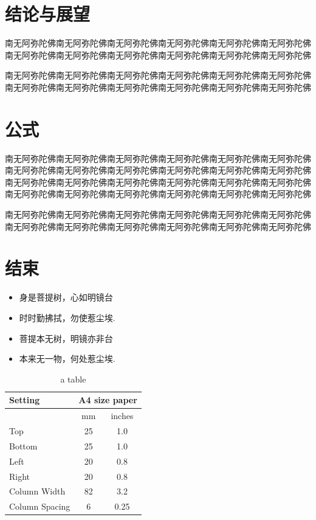 \documentclass[UTF8,a4paper,10pt]{article}
\begin{document}
\section{结论与展望}
南无阿弥陀佛南无阿弥陀佛南无阿弥陀佛南无阿弥陀佛南无阿弥陀佛南无阿弥陀佛南无阿弥陀佛南无阿弥陀佛南无阿弥陀佛南无阿弥陀佛南无阿弥陀佛南无阿弥陀佛
\par

\noindent 南无阿弥陀佛南无阿弥陀佛南无阿弥陀佛南无阿弥陀佛南无阿弥陀佛南无阿弥陀佛南无阿弥陀佛南无阿弥陀佛南无阿弥陀佛南无阿弥陀佛南无阿弥陀佛南无阿弥陀佛
\section{公式}
南无阿弥陀佛南无阿弥陀佛南无阿弥陀佛南无阿弥陀佛南无阿弥陀佛南无阿弥陀佛南无阿弥陀佛南无阿弥陀佛南无阿弥陀佛南无阿弥陀佛南无阿弥陀佛南无阿弥陀佛南无阿弥陀佛南无阿弥陀佛南无阿弥陀佛南无阿弥陀佛南无阿弥陀佛南无阿弥陀佛南无阿弥陀佛南无阿弥陀佛南无阿弥陀佛南无阿弥陀佛南无阿弥陀佛南无阿弥陀佛
\noindent

\par\noindent
南无阿弥陀佛南无阿弥陀佛南无阿弥陀佛南无阿弥陀佛南无阿弥陀佛南无阿弥陀佛南无阿弥陀佛南无阿弥陀佛南无阿弥陀佛南无阿弥陀佛南无阿弥陀佛南无阿弥陀佛
\section{结束}


\begin{itemize}
    \item 身是菩提树，心如明镜台
    \item 时时勤拂拭，勿使惹尘埃.
    \item 菩提本无树，明镜亦非台
    \item 本来无一物，何处惹尘埃.
\end{itemize}

\vspace{3ex}
\begin{table}[h]
    \centering
    \begin{tabular}{|l|c|c|}\hline
        Setting&\multicolumn{2}{c|}{A4 size paper}\\\hline
        &mm&inches\\
        Top&25&1.0\\
        Bottom&25&1.0\\
        Left&20&0.8\\
        Right&20&0.8\\
        Column Width&82&3.2\\
        Column Spacing&6&0.25\\\hline
    \end{tabular}
    \caption{a table}
    \label{tab:table1}
\end{table}
\vspace{3ex}
\end{document}
